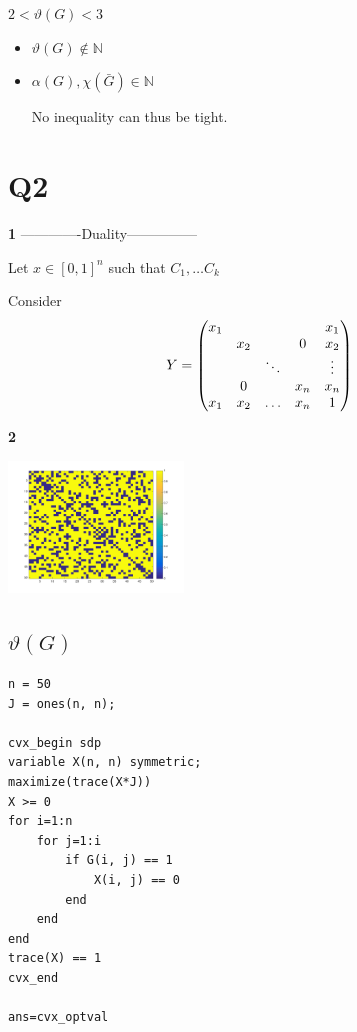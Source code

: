 \documentclass[11pt]{article}
\begin{document}
\(2 < \vartheta(G) < 3\)

\begin{itemize}
\item \(\vartheta(G) \not \in \mathbb N\)
\item \(\alpha(G), \chi(\bar G) \in \mathbb N\)

No inequality can thus be tight.
\end{itemize}

\section{Q2}
\label{sec:orgheadline4}

\textbf{1}
-------------Duality---------------

Let \(x \in [0, 1]^n\) such that \(C_1, \ldots C_k\)

Consider
\[Y = \begin{pmatrix}
x_1 & \hfill & \hfill & \hfill & x_1 \\
\hfill & x_2 & \hfill & 0 & x_2 \\
\hfill & \hfill & \ddots &\hfill & \vdots \\
\hfill & 0 & \hfill & x_n & x_n \\
x_1 & x_2 & \ldots & x_n & 1 \\
\end{pmatrix}\]




\textbf{2}
\begin{org}
\begin{center}
\includegraphics[width=0.35\textwidth]{graph.png}
\end{center}
\end{org}




\subsection{\(\vartheta(G)\)}
\label{sec:orgheadline2}
\begin{verbatim}
n = 50
J = ones(n, n);

cvx_begin sdp
variable X(n, n) symmetric;
maximize(trace(X*J))
X >= 0
for i=1:n
    for j=1:i
        if G(i, j) == 1
            X(i, j) == 0
        end
    end
end
trace(X) == 1
cvx_end

ans=cvx_optval
\end{verbatim}
\end{document}
